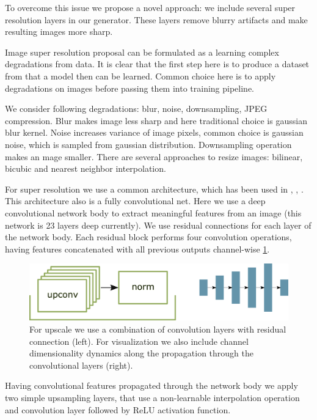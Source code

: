 To overcome this issue we propose a novel approach: we include several super resolution layers in our generator. These layers remove blurry artifacts and make resulting images more sharp.

Image super resolution proposal can be formulated as a learning complex degradations from data. It is clear that the first step here is to produce a dataset from that a model then can be learned. Common choice here is to apply degradations on images before passing them into training pipeline.

We consider following degradations: blur, noise, downsampling, JPEG compression. Blur makes image less sharp and here traditional choice is gaussian blur kernel. Noise increases variance of image pixels, common choice is gaussian noise, which is sampled from gaussian distribution. Downsampling operation makes an mage smaller. There are several approaches to resize images: bilinear, bicubic and nearest neighbor interpolation.

For super resolution we use a common architecture, which has been used in \cite{Ledig_Theis_Huszar_Caballero_Cunningham_Acosta_Aitken_Tejani_Totz_Wang_et_al_2017}, \cite{Wang_Yu_Wu_Gu_Liu_Dong_Qiao_Loy_2019}, \cite{Wang_Xie_Dong_Shan_2021}. This architecture also is a fully convolutional net. Here we use a deep convolutional network body to extract meaningful features from an image (this network is 23 layers deep currently). We use residual connections for each layer of the network body. Each residual block performs four convolution operations, having features concatenated with all previous outputs channel-wise \ref{upscale}.

\begin{figure}[!ht]
    \centering
    \includegraphics[width=\textwidth]{figure/upscale.png}
    \caption{For upscale we use a combination of convolution layers with residual connection (left). For visualization we also include channel dimensionality dynamics along the propagation through the convolutional layers (right).}
    \label{upscale}
\end{figure}

Having convolutional features propagated through the network body we apply two simple upsampling layers, that use a non-learnable interpolation operation and convolution layer followed by ReLU activation function.

